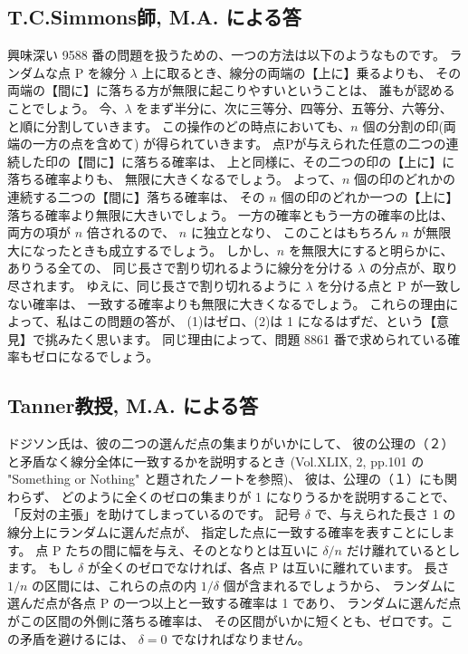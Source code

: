 \documentclass{article}
\begin{document}
\subsection*{T.C.Simmons師, M.A. による答}

 興味深い 9588 番の問題を扱うための、一つの方法は以下のようなものです。
ランダムな点 P を線分 $\lambda$ 上に取るとき、線分の両端の【上に】乗るよりも、
その両端の【間に】に落ちる方が無限に起こりやすいということは、
誰もが認めることでしょう。
今、$\lambda$ をまず半分に、次に三等分、四等分、五等分、六等分、と順に分割していきます。
この操作のどの時点においても、$n$ 個の分割の印(両端の一方の点を含めて)
が得られていきます。
点Pが与えられた任意の二つの連続した印の【間に】に落ちる確率は、
上と同様に、その二つの印の【上に】に落ちる確率よりも、
無限に大きくなるでしょう。
よって、$n$ 個の印のどれかの連続する二つの【間に】落ちる確率は、
その $n$ 個の印のどれか一つの【上に】落ちる確率より無限に大きいでしょう。
一方の確率ともう一方の確率の比は、両方の項が $n$ 倍されるので、
$n$ に独立となり、
このことはもちろん $n$ が無限大になったときも成立するでしょう。
しかし、$n$ を無限大にすると明らかに、ありうる全ての、
同じ長さで割り切れるように線分を分ける $\lambda$ の分点が、取り尽されます。
ゆえに、同じ長さで割り切れるように $\lambda$ を分ける点と P が一致しない確率は、
一致する確率よりも無限に大きくなるでしょう。
これらの理由によって、私はこの問題の答が、
(1)はゼロ、(2)は 1 になるはずだ、という【意見】で挑みたく思います。
  同じ理由によって、問題 8861 番で求められている確率もゼロになるでしょう。

\subsection*{Tanner教授, M.A. による答}

 ドジソン氏は、彼の二つの選んだ点の集まりがいかにして、
彼の公理の（２）と矛盾なく線分全体に一致するかを説明するとき
(Vol.XLIX, 2, pp.101 の "Something or Nothing" と題されたノートを参照)、
彼は、公理の（１）にも関わらず、
どのように全くのゼロの集まりが 1 になりうるかを説明することで、
「反対の主張」を助けてしまっているのです。
 記号 $\delta$ で、与えられた長さ 1 の線分上にランダムに選んだ点が、
指定した点に一致する確率を表すことにします。
点 P たちの間に幅を与え、そのとなりとは互いに $\delta / n$
だけ離れているとします。
もし $\delta$ が全くのゼロでなければ、各点 P は互いに離れています。
長さ $1/n$ の区間には、これらの点の内 $1/\delta$ 個が含まれるでしょうから、
ランダムに選んだ点が各点 P の一つ以上と一致する確率は 1 であり、
ランダムに選んだ点がこの区間の外側に落ちる確率は、
その区間がいかに短くとも、ゼロです。この矛盾を避けるには、
$\delta = 0$ でなければなりません。
\end{document}
